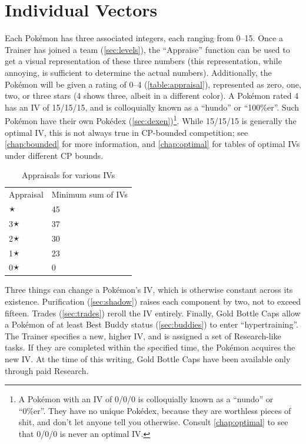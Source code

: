 \section{Individual Vectors\label{sec:ivs}}
Each Pokémon has three associated integers, each ranging from 0--15.
Once a Trainer has joined a team (\autoref{sec:levels}), the ``Appraise'' function can be used to
  get a visual representation of these three numbers (this representation,
  while annoying, is sufficient to determine the actual numbers).
Additionally, the Pokémon will be given a rating of 0--4 (\autoref{table:appraisal}), represented as
  zero, one, two, or three stars (4 shows three, albeit in a different color).
A Pokémon rated 4 has an IV of 15/15/15, and is colloquially known as a ``hundo'' or ``100\%er''.
Such Pokémon have their own Pokédex (\autoref{sec:dexen})\footnote{A Pokémon with an IV of 0/0/0
 is colloquially known as a ``nundo'' or ``0\%er''. They have no unique Pokédex, because they are worthless pieces of shit,
  and don't let anyone tell you otherwise. Consult \autoref{chap:optimal} to see that 0/0/0 is never an optimal IV.}.
While 15/15/15 is generally the optimal IV, this is not always true in CP-bounded
  competition; see \autoref{chap:bounded} for more information,
  and \autoref{chap:optimal} for tables of optimal IVs under different CP bounds.
\begin{table}
\centering
\begin{tabular}{ll}
Appraisal & Minimum sum of IVs\\
\Midrule
4🟉 & 45\\
3🟉 & 37\\
2🟉 & 30\\
1🟉 & 23\\
0🟉 & 0\\
\end{tabular}
\caption{Appraisals for various IVs\label{table:appraisal}}
\end{table}

Three things can change a Pokémon's IV, which is otherwise constant across its existence.
Purification (\autoref{sec:shadow}) raises each component by two, not to exceed fifteen.
Trades (\autoref{sec:trades}) reroll the IV entirely.
Finally, Gold Bottle Caps allow a Pokémon of at least Best Buddy status (\autoref{sec:buddies}) 
  to enter ``hypertraining''.
The Trainer specifies a new, higher IV, and is assigned a set of Research-like tasks.
If they are completed within the specified time, the Pokémon acquires the new IV.
At the time of this writing, Gold Bottle Caps have been available only through paid Research.

